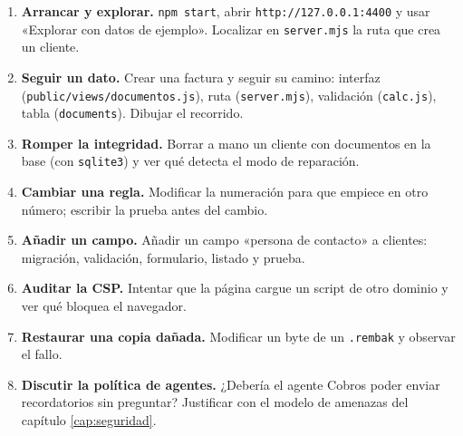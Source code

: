 \begin{enumerate}
\def\labelenumi{\arabic{enumi}.}
\tightlist
\item
  \textbf{Arrancar y explorar.} \texttt{npm\ start}, abrir \texttt{http://127.0.0.1:4400} y usar «Explorar con datos de ejemplo». Localizar en \texttt{server.mjs} la ruta que crea un cliente.
\item
  \textbf{Seguir un dato.} Crear una factura y seguir su camino: interfaz (\texttt{public/views/documentos.js}), ruta (\texttt{server.mjs}), validación (\texttt{calc.js}), tabla (\texttt{documents}). Dibujar el recorrido.
\item
  \textbf{Romper la integridad.} Borrar a mano un cliente con documentos en la base (con \texttt{sqlite3}) y ver qué detecta el modo de reparación.
\item
  \textbf{Cambiar una regla.} Modificar la numeración para que empiece en otro número; escribir la prueba antes del cambio.
\item
  \textbf{Añadir un campo.} Añadir un campo «persona de contacto» a clientes: migración, validación, formulario, listado y prueba.
\item
  \textbf{Auditar la CSP.} Intentar que la página cargue un script de otro dominio y ver qué bloquea el navegador.
\item
  \textbf{Restaurar una copia dañada.} Modificar un byte de un \texttt{.rembak} y observar el fallo.
\item
  \textbf{Discutir la política de agentes.} ¿Debería el agente Cobros poder enviar recordatorios sin preguntar? Justificar con el modelo de amenazas del capítulo \ref{cap:seguridad}.
\end{enumerate}
